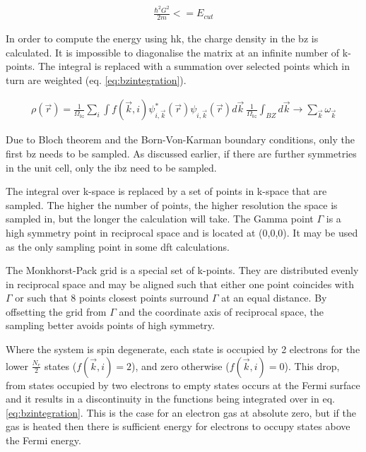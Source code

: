  \begin{equation}
   \begin{split}
     \frac{\hbar^2 G^2}{2m} <= E_{cut}
   \end{split}
   \label{eq:planewaveecutoff}
 \end{equation}


In order to compute the energy using \acrshort{hk}, the charge density in the \acrshort{bz} is calculated.  It is impossible to diagonalise the matrix at an infinite number of k-points.  The integral is replaced with a summation over selected points which in turn are weighted (eq. \ref{eq:bzintegration})\cite{bzsampling}.  

\begin{equation}
\begin{split}
\rho(\vec{r}) = \frac{1}{\Omega_{bz}} \sum_{i} \int f(\vec{k}, i) \psi^{*}_{i, \vec{k}}(\vec{r}) \psi_{i, \vec{k}} (\vec{r}) d\vec{k} \
\frac{1}{\Omega_{bz}} \int_{BZ} d\vec{k} \rightarrow \sum_{\vec{k}} \omega_{\vec{k}}
\end{split}
\label{eq:bzintegration}
\end{equation}

Due to Bloch theorem and the Born-Von-Karman boundary conditions, only the first \acrshort{bz} needs to be sampled.  As discussed earlier, if there are further symmetries in the unit cell, only the \acrshort{ibz} need to be sampled.

The integral over k-space is replaced by a set of points in k-space that are sampled.  The higher the number of points, the higher resolution the space is sampled in, but the longer the calculation will take.  The Gamma point $\Gamma$ is a high symmetry point in reciprocal space and is located at (0,0,0).  It may be used as the only sampling point in some \acrshort{dft} calculations.

The Monkhorst-Pack grid is a special set of k-points.  They are distributed evenly in reciprocal space and may be aligned such that either one point coincides with $\Gamma$ or such that 8 points closest points surround $\Gamma$ at an equal distance.  By offsetting the grid from $\Gamma$ and the coordinate axis of reciprocal space, the sampling better avoids points of high symmetry.   

Where the system is spin degenerate, each state is occupied by 2 electrons for the lower $\frac{N_e}{2}$ states ($f(\vec{k}, i) = 2$), and zero otherwise ($f(\vec{k}, i) = 0$)\cite{marzarithesis1}.  This drop, from states occupied by two electrons to empty states occurs at the Fermi surface and it results in a discontinuity in the functions being integrated over in eq. \ref{eq:bzintegration}.  This is the case for an electron gas at absolute zero, but if the gas is heated then there is sufficient energy for electrons to occupy states above the Fermi energy.

